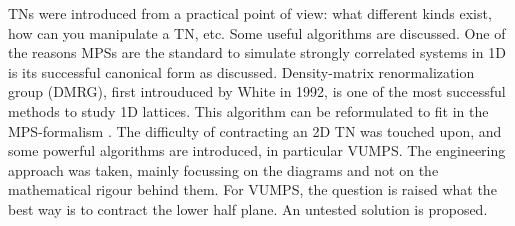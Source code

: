 \Glspl{TN} were introduced from a practical point of view: what different kinds exist, how can you manipulate a \Gls{TN}, etc. Some useful algorithms are discussed. One of the reasons \Glspl{MPS} are the standard to simulate strongly correlated systems in 1D is its successful canonical form as discussed.  Density-matrix renormalization group (DMRG), first introuduced by White in 1992, is one of the most successful methods to study 1D lattices. This algorithm can be reformulated to fit in the \Gls{MPS}-formalism \cite{Schollwock2011}. The difficulty of contracting an 2D \Gls{TN} was touched upon, and some powerful algorithms are introduced, in particular \Gls{VUMPS}. The engineering approach was taken, mainly focussing on the diagrams and not on the mathematical rigour behind them. For \Gls{VUMPS}, the question is raised what the best way is to contract the lower half plane. An untested solution is proposed.